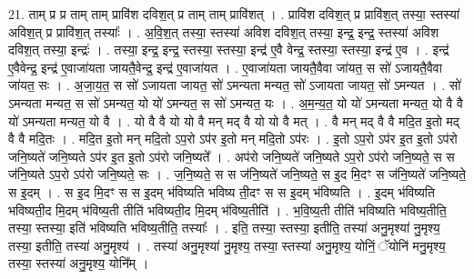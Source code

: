 \documentclass[17pt]{extarticle}
\begin{document}
21. ताम् प्र प्र ताम् ताम् प्रावि॑श दविश॒त् प्र ताम् ताम् प्रावि॑शत् । . प्रावि॑श दविश॒त् प्र प्रावि॑श॒त् तस्या॒ स्तस्या॑ अविश॒त् प्र प्रावि॑श॒त् तस्याः᳚ । . अ॒वि॒श॒त् तस्या॒ स्तस्या॑ अविश दविश॒त् तस्या॒ इन्द्र॒ इन्द्र॒ स्तस्या॑ अविश दविश॒त् तस्या॒ इन्द्रः॑ । . तस्या॒ इन्द्र॒ इन्द्र॒ स्तस्या॒ स्तस्या॒ इन्द्र॑ ए॒वै वेन्द्र॒ स्तस्या॒ स्तस्या॒ इन्द्र॑ ए॒व । . इन्द्र॑ ए॒वैवेन्द्र॒ इन्द्र॑ ए॒वाजा॑यता जायतै॒वेन्द्र॒ इन्द्र॑ ए॒वाजा॑यत । . ए॒वाजा॑यता जायतै॒वैवा जा॑यत॒ स सो॑ ऽजायतै॒वैवा जा॑यत॒ सः । . अ॒जा॒य॒त॒ स सो॑ ऽजायता जायत॒ सो॑ ऽमन्यता मन्यत॒ सो॑ ऽजायता जायत॒ सो॑ ऽमन्यत । . सो॑ ऽमन्यता मन्यत॒ स सो॑ ऽमन्यत॒ यो यो॑ ऽमन्यत॒ स सो॑ ऽमन्यत॒ यः । . अ॒म॒न्य॒त॒ यो यो॑ ऽमन्यता मन्यत॒ यो वै वै यो॑ ऽमन्यता मन्यत॒ यो वै । . यो वै वै यो यो वै मन् मद् वै यो यो वै मत् । . वै मन् मद् वै वै मदि॒त इ॒तो मद् वै वै मदि॒तः । . मदि॒त इ॒तो मन् मदि॒तो ऽप॒रो ऽप॑र इ॒तो मन् मदि॒तो ऽप॑रः । . इ॒तो ऽप॒रो ऽप॑र इ॒त इ॒तो ऽप॑रो जनि॒ष्यते॑ जनि॒ष्यते ऽप॑र इ॒त इ॒तो ऽप॑रो जनि॒ष्यते᳚ । . अप॑रो जनि॒ष्यते॑ जनि॒ष्यते ऽप॒रो ऽप॑रो जनि॒ष्यते॒ स स ज॑नि॒ष्यते ऽप॒रो ऽप॑रो जनि॒ष्यते॒ सः । . ज॒नि॒ष्यते॒ स स ज॑नि॒ष्यते॑ जनि॒ष्यते॒ स इ॒द मि॒दꣳ स ज॑नि॒ष्यते॑ जनि॒ष्यते॒ स इ॒दम् । . स इ॒द मि॒दꣳ स स इ॒दम् भ॑विष्यति भविष्य ती॒दꣳ स स इ॒दम् भ॑विष्यति । . इ॒दम् भ॑विष्यति भविष्यती॒द मि॒दम् भ॑विष्य॒ती तीति॑ भविष्यती॒द मि॒दम् भ॑विष्य॒तीति॑ । . भ॒वि॒ष्य॒ती तीति॑ भविष्यति भविष्य॒तीति॒ तस्या॒ स्तस्या॒ इति॑ भविष्यति भविष्य॒तीति॒ तस्याः᳚ । . इति॒ तस्या॒ स्तस्या॒ इतीति॒ तस्या॑ अनु॒मृश्या॑ नु॒मृश्य॒ तस्या॒ इतीति॒ तस्या॑ अनु॒मृश्य॑ । . तस्या॑ अनु॒मृश्या॑ नु॒मृश्य॒ तस्या॒ स्तस्या॑ अनु॒मृश्य॒ योनिं॒ ॅयोनि॑ मनु॒मृश्य॒ तस्या॒ स्तस्या॑ अनु॒मृश्य॒ योनि᳚म् । \newline
\end{document}
